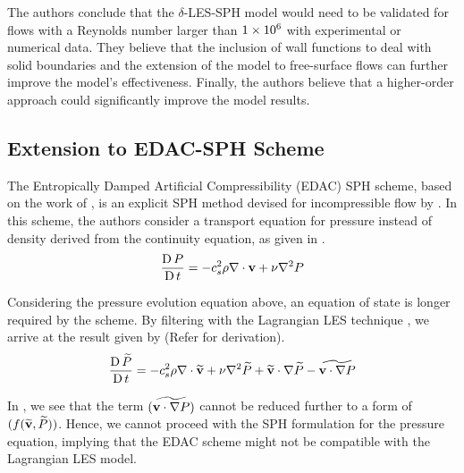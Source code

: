 The authors conclude that the $\delta$-LES-SPH model would need to be validated for flows with a Reynolds number larger than $1 \times {10}^{6}$ with experimental or numerical data. They believe that the inclusion of wall functions to deal with solid boundaries and the extension of the model to free-surface flows can further improve the model’s effectiveness. Finally, the authors believe that a higher-order approach could significantly improve the model results.

\subsection{Extension to EDAC-SPH Scheme}
\label{sec:Extension-to-EDAC-SPH-Scheme}
The Entropically Damped Artificial Compressibility (EDAC) SPH scheme, based on the work of \parencite{Clausen2013}, is an explicit SPH method devised for incompressible flow by \parencite{Ramachandran2019}.
In this scheme, the authors consider a transport equation for pressure instead of density derived from the continuity equation, as given in .
\begin{equation}
    \frac{\operatorname{D} P}{\operatorname{D} t} = -c_s^2 \rho \nabla \cdot \mathbf{v} + \nu \nabla^2 P
    \label{eq:Ramachandran2019-edac-p-transport}
\end{equation}

Considering the pressure evolution equation above, an equation of state is longer required by the scheme.
By filtering  with the Lagrangian LES technique \parencite{DiMascio2017}, we arrive at the result given by  (Refer  for derivation).
\begin{equation}
    \frac{\operatorname{D} \widetilde{P}}{\operatorname{D} t} = -c_s^2 \rho \nabla \cdot \widetilde{\mathbf{v}} + \nu \nabla^2 \widetilde{P} + \widetilde{\mathbf{v}} \cdot \nabla \widetilde{P} - \widetilde{\mathbf{v}\cdot\nabla P}
    \label{eq:edac-filtered}
\end{equation}

In , we see that the term $(\widetilde{\mathbf{v}\cdot\nabla P})$ cannot be reduced further to a form of $(f(\widetilde{\mathbf{v}}, \widetilde{P}))$. Hence, we cannot proceed with the SPH formulation for the pressure equation, implying that the EDAC scheme might not be compatible with the Lagrangian LES model.

